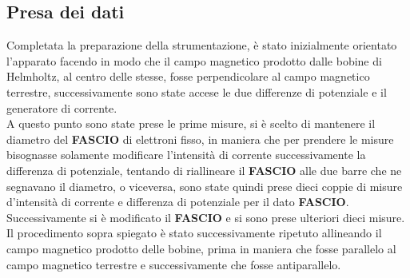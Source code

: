 \subsection{Presa dei dati}
    Completata la preparazione della strumentazione, 
    è stato inizialmente orientato l'apparato facendo in modo che il campo magnetico prodotto dalle bobine di Helmholtz, al centro delle stesse, fosse perpendicolare 
    al campo magnetico terrestre, successivamente sono state accese le due differenze di potenziale e il generatore di corrente.\\
    A questo punto sono state prese le prime misure, si è scelto di mantenere il diametro del \textbf{FASCIO} di elettroni fisso, in maniera che per prendere le misure bisognasse 
    solamente modificare l'intensità di corrente successivamente la differenza di potenziale, tentando di riallineare il \textbf{FASCIO} alle due barre che ne segnavano il diametro, 
    o viceversa, sono state quindi prese dieci coppie di misure d'intensità di corrente e differenza di potenziale per il dato \textbf{FASCIO}.\\
    Successivamente si è modificato il \textbf{FASCIO} e si sono prese ulteriori dieci misure.\\
    Il procedimento sopra spiegato è stato successivamente ripetuto allineando il campo magnetico prodotto delle bobine, prima in maniera che fosse parallelo al campo 
    magnetico terrestre e successivamente che fosse antiparallelo.